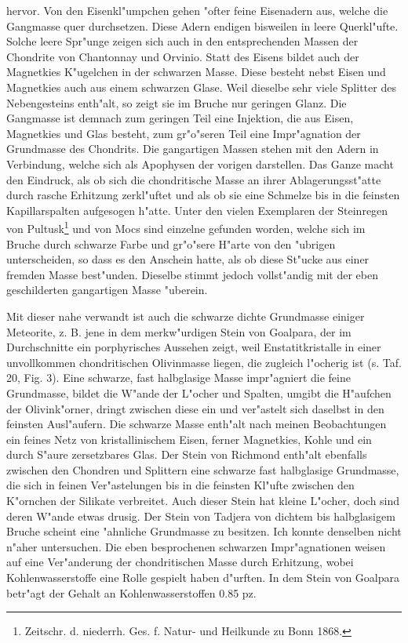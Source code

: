 \documentclass[a4paper, 11pt, oneside, polutonikogreek, german]{article}
\begin{document}
hervor. Von den Eisenkl"umpchen gehen "ofter feine Eisenadern aus, welche die Gangmasse quer durchsetzen. Diese Adern endigen bisweilen in leere Querkl"ufte. Solche leere Spr"unge zeigen sich auch in den entsprechenden Massen der Chondrite von Chantonnay und Orvinio. Statt des Eisens bildet auch der Magnetkies K"ugelchen in der schwarzen Masse. Diese besteht nebst Eisen und Magnetkies auch aus einem schwarzen Glase. Weil dieselbe sehr viele Splitter des Nebengesteins enth"alt, so zeigt sie im Bruche nur geringen Glanz. Die Gangmasse ist demnach zum geringen Teil eine Injektion, die aus Eisen, Magnetkies und Glas besteht, zum gr"o"seren Teil eine Impr"agnation der Grundmasse des Chondrits. Die gangartigen Massen stehen mit den Adern in Verbindung, welche sich als Apophysen der vorigen darstellen. Das Ganze macht den Eindruck, als ob sich die chondritische Masse an ihrer Ablagerungsst"atte durch rasche Erhitzung zerkl"uftet und als ob sie eine Schmelze bis in die feinsten Kapillarspalten aufgesogen h"atte. Unter den vielen Exemplaren der Steinregen von Pultusk\footnote{Zeitschr. d. niederrh. Ges. f. Natur- und Heilkunde zu Bonn 1868.} und von Mocs sind einzelne gefunden worden, welche sich im Bruche durch schwarze Farbe und gr"o"sere H"arte von den "ubrigen unterscheiden, so dass es den Anschein hatte, als ob diese St"ucke aus einer fremden Masse best"unden. Dieselbe stimmt jedoch vollst"andig mit der eben geschilderten gangartigen Masse "uberein.

Mit dieser nahe verwandt ist auch die schwarze dichte Grundmasse einiger Meteorite, z. B. jene in dem merkw"urdigen Stein von Goalpara, der im Durchschnitte ein porphyrisches Aussehen zeigt, weil Enstatitkristalle in einer unvollkommen chondritischen Olivinmasse liegen, die zugleich l"ocherig ist (s. Taf. 20, Fig. 3). Eine schwarze, fast halbglasige Masse impr"agniert die feine Grundmasse, bildet die W"ande der L"ocher und Spalten, umgibt die H"aufchen der Olivink"orner, dringt zwischen diese ein und ver"astelt sich daselbst in den feinsten Ausl"aufern. Die schwarze Masse enth"alt nach meinen Beobachtungen ein feines Netz von kristallinischem Eisen, ferner Magnetkies, Kohle und ein durch S"aure zersetzbares Glas. Der Stein von Richmond enth"alt ebenfalls zwischen den Chondren und Splittern eine schwarze fast halbglasige Grundmasse, die sich in feinen Ver"astelungen bis in die feinsten Kl"ufte zwischen den K"ornchen der Silikate verbreitet. Auch dieser Stein hat kleine L"ocher, doch sind deren W"ande etwas drusig. Der Stein von Tadjera von dichtem bis halbglasigem Bruche scheint eine "ahnliche Grundmasse zu besitzen. Ich konnte denselben nicht n"aher untersuchen. Die eben besprochenen schwarzen Impr"agnationen weisen auf eine Ver"anderung der chondritischen Masse durch Erhitzung, wobei Kohlenwasserstoffe eine Rolle gespielt haben d"urften. In dem Stein von Goalpara betr"agt der Gehalt an Kohlenwasserstoffen 0.85 pz.
\end{document}
